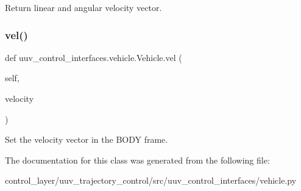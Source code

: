 \begin{DoxyVerb}Return linear and angular velocity vector.\end{DoxyVerb}
 \mbox{\label{classuuv__control__interfaces_1_1vehicle_1_1Vehicle_aa725d4189b5720ff517a692ee3196c17}} 
\subsubsection{\texorpdfstring{vel()}{vel()}\hspace{0.1cm}{\footnotesize\ttfamily [2/2]}}
{\footnotesize\ttfamily def uuv\+\_\+control\+\_\+interfaces.\+vehicle.\+Vehicle.\+vel (\begin{DoxyParamCaption}\item[{}]{self,  }\item[{}]{velocity }\end{DoxyParamCaption})}

\begin{DoxyVerb}Set the velocity vector in the BODY frame.\end{DoxyVerb}
 

The documentation for this class was generated from the following file\+:\begin{DoxyCompactItemize}
\item 
control\+\_\+layer/uuv\+\_\+trajectory\+\_\+control/src/uuv\+\_\+control\+\_\+interfaces/vehicle.\+py\end{DoxyCompactItemize}
